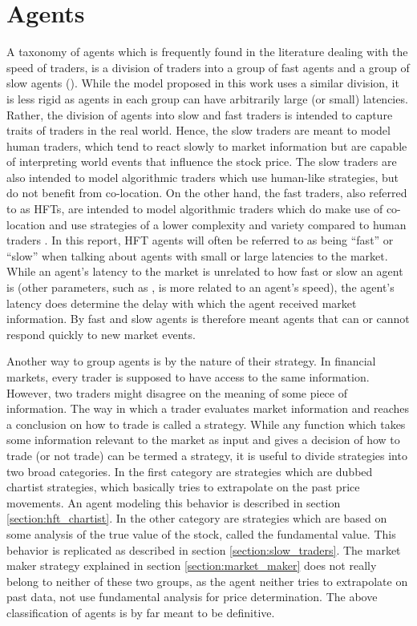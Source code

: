 \section{Agents}\label{section:agents}

A taxonomy of agents which is frequently found in the literature dealing with the speed of traders, is a division of traders into a group of fast agents and a group of slow agents (\cite{foucault2012news, hoffmann2012dynamic, mcinish2012strategic}). While the model proposed in this work uses a similar division, it is less rigid as agents in each group can have arbitrarily large (or small) latencies. Rather, the division of agents into slow and fast traders is intended to capture traits of traders in the real world. Hence, the slow traders are meant to model human traders, which tend to react slowly to market information but are capable of interpreting world events that influence the stock price. The slow traders are also intended to model algorithmic traders which use human-like strategies, but do not benefit from co-location. On the other hand, the fast traders, also referred to as HFTs, are intended to model algorithmic traders which do make use of co-location \cite{brogaard2013trading} and use strategies of a lower complexity and variety compared to human traders \cite{chaboud2009rise}.  In this report, HFT agents will often be referred to as being ``fast'' or ``slow'' when talking about agents with small or large latencies to the market. While an agent's latency to the market is unrelated to how fast or slow an agent is (other parameters, such as ,  is more related to an agent's speed), the agent's latency does determine the delay with which the agent received market information. By fast and slow agents is therefore meant agents that can or cannot respond quickly to new market events.

Another way to group agents is by the nature of their strategy. In financial markets, every trader is supposed to have access to the same information. However, two traders might disagree on the meaning of some piece of information. The way in which a trader evaluates market information and reaches a conclusion on how to trade is called a strategy. While any function which takes some information relevant to the market as input and gives a decision of how to trade (or not trade) can be termed a strategy, it is useful to divide strategies into two broad categories. In the first category are strategies which are dubbed chartist strategies, which basically tries to extrapolate on the past price movements. An agent modeling this behavior is described in section \ref{section:hft_chartist}. In the other category are strategies which are based on some analysis of the true value of the stock, called the fundamental value. This behavior is replicated as described in section \ref{section:slow_traders}. The market maker strategy explained in section \ref{section:market_maker} does not really belong to neither of these two groups, as the agent neither tries to extrapolate on past data, not use fundamental analysis for price determination. The above classification of agents is by far meant to be definitive. 





